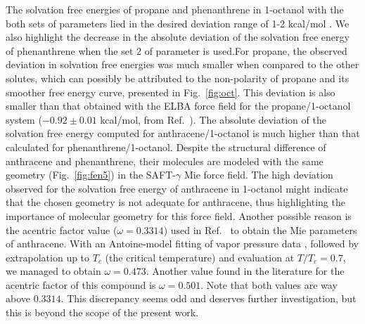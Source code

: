 \documentclass[preprint]{elsarticle}
\begin{document}
	The solvation free energies of propane and phenanthrene in 1-octanol with the both sets of parameters lied in the desired deviation range of 1-2 kcal/mol \cite{doimobley}. We also highlight the decrease in the absolute deviation of the solvation free energy of phenanthrene when the set 2 of parameter is used.For propane, the observed deviation in solvation free energies was much smaller when compared to the other solutes, which can possibly be attributed to the non-polarity of propane and its smoother free energy curve, presented in Fig.~\ref{fig:oct}. This deviation is also smaller than that obtained with the ELBA force field for the propane/1-octanol system ($-0.92 \pm 0.01$ kcal/mol, from Ref.~). The absolute deviation of the solvation free energy computed for anthracene/1-octanol is much higher than that calculated for phenanthrene/1-octanol. Despite the structural difference of anthracene and phenanthrene, their molecules are modeled with the same geometry (Fig.~\ref{fig:fen5}) in the SAFT-$\gamma$ Mie force field. The high deviation observed for the solvation free energy of anthracene in 1-octanol might indicate that the chosen geometry is not adequate for anthracene, thus highlighting the importance of molecular geometry for this force field.
	Another possible reason is the acentric factor value ($\omega=0.3314$) used in Ref.~ to obtain the Mie parameters of anthracene.
	With an Antoine-model fitting of vapor pressure data \cite{murphy}, followed by extrapolation up to $T_c$ (the critical temperature) \cite{muller2017} and evaluation at $T/T_c=0.7$, we managed to obtain $\omega=0.473$.
	Another value found in the literature \cite{poling2000properties} for the acentric factor of this compound is $\omega=0.501$.
	Note that both values are way above $0.3314$.
	This discrepancy seems odd and deserves further investigation, but this is beyond the scope of the present work.
\end{document}
